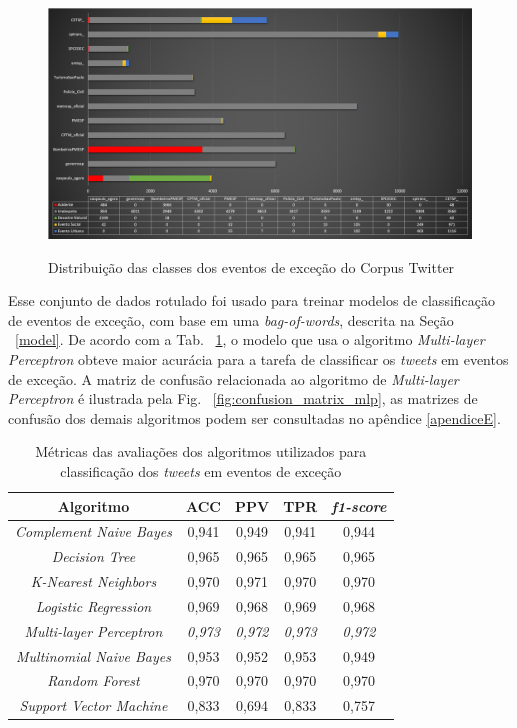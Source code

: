 \documentclass[
	12pt,				%
	oneside,			%
	a4paper,			%
	english,			%
	brazil				%
	]{abntex2ppgsi}
\begin{document}
{{\begin{figure}[!htb]
	\centering
 	  \caption{Distribuição das classes dos eventos de exceção do Corpus Twitter}
		\includegraphics[width=1\linewidth]{images/tweets_distribution_pt.png}
	\label{fig:tweets_distribution}
\end{figure}

Esse conjunto de dados rotulado foi usado para treinar modelos de classificação de eventos de exceção, com base em uma \textit{bag-of-words}, descrita na Seção ~\ref{model}. De acordo com a Tab. ~\ref{tab:metrics}, o modelo que usa o algoritmo \textit{Multi-layer Perceptron} obteve maior acurácia para a tarefa de classificar os \textit{tweets} em eventos de exceção. A matriz de confusão relacionada ao algoritmo de \textit{Multi-layer Perceptron} é ilustrada pela Fig. ~\ref{fig:confusion_matrix_mlp}, as matrizes de confusão dos demais algoritmos podem ser consultadas no apêndice \ref{apendiceE}.

\begin{table}[!htb]
\centering
\caption {Métricas das avaliações dos algoritmos utilizados para classificação dos \textit{tweets} em eventos de exceção}
\label {tab:metrics}
\begin{tabular}{c|c|c|c|c}
\toprule
\textbf{Algoritmo} & \textbf{ACC} & \textbf{PPV} & \textbf{TPR} & \textbf{\textit{f1-score}} \\
\midrule
\textit{Complement Naive Bayes} & 0,941 & 0,949 & 0,941 & 0,944 \\
\hline
\textit{Decision Tree} & 0,965 & 0,965 & 0,965 & 0,965 \\
\hline
\textit{K-Nearest Neighbors} & 0,970 & 0,971 & 0,970 & 0,970 \\
\hline
\textit{Logistic Regression} & 0,969 & 0,968 & 0,969 & 0,968 \\
\hline
\textit{Multi-layer Perceptron} & \textit{0,973} & \textit{0,972} & \textit{0,973} & \textit{0,972} \\
\hline
\textit{Multinomial Naive Bayes} & 0,953 & 0,952 & 0,953 & 0,949 \\
\hline
\textit{Random Forest} & 0,970 & 0,970 & 0,970 & 0,970 \\
\hline
\textit{Support Vector Machine} & 0,833 & 0,694 & 0,833 & 0,757 \\
\bottomrule
\end{tabular}\end{table}


}}
\end{document}
